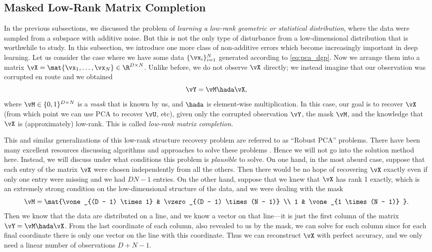 \documentclass[../../book-main.tex]{subfiles}
\begin{document}
\subsection{Masked Low-Rank Matrix Completion}

In the previous subsections, we discussed the problem of
\textit{learning a low-rank geometric or statistical distribution},
where the data were sampled from a subspace with additive noise. But
this is not the only type of disturbance from a low-dimensional
distribution that is worthwhile to study. In this subsection, we
introduce one more class of non-additive errors which become
increasingly important in deep learning. Let us consider the case
where we have some data \(\{\vx_{i}\}_{i = 1}^{N}\) generated
according to \eqref{eq:pca_dgp}. Now we arrange them into a matrix
\(\vX = \mat{\vx_{1}, \dots, \vx_{N}} \in \R^{D \times N}\). Unlike
before, we do not observe \(\vX\) directly; we instead imagine that
our observation was corrupted en route and we obtained
\begin{equation}
    \vY = \vM \hada \vX,
\end{equation}
where \(\vM \in \{0, 1\}^{D \times N}\) is a \textit{mask} that is known by us,
and \(\hada\) is element-wise multiplication. In this case, our goal
is to recover \(\vX\) (from which point we can use PCA to recover
\(\vU\), etc), given only the corrupted observation \(\vY\), the mask
\(\vM\), and the knowledge that \(\vX\) is (approximately) low-rank.
This is called \textit{low-rank matrix completion}.

This and similar generalizations of this low-rank structure recovery
problem are referred to as  ``Robust PCA'' problems. There have been
many excellent resources discussing algorithms and approaches to
solve these problems \cite{Wright-Ma-2022}. Hence we will not go into
the solution method here. Instead, we will discuss under what
conditions this problem is \textit{plausible} to solve. On one hand,
in the most absurd case, suppose that each entry of the matrix
\(\vX\) were chosen independently from all the others. Then there
would be no hope of recovering \(\vX\) exactly even if only one entry
were missing and we had \(DN - 1\) entries. On the other hand,
suppose that we knew that \(\vX\) has rank 1 exactly, which is an
extremely strong condition on the low-dimensional structure of the
data, and we were dealing with the mask
\begin{equation}
    \vM = \mat{\vone_{(D - 1) \times 1} & \vzero_{(D - 1) \times (N -
    1)} \\ 1 & \vone_{1 \times (N - 1)} }.
\end{equation}
Then we know that the data are distributed on a line, and we know a vector on
that line---it is just the first column of the matrix \(\vY = \vM
\hada \vX\). From the last coordinate of each column, also revealed
to us by the mask, we can solve for each column since for each final
coordinate there is only one vector on the line with this coordinate.
Thus we can reconstruct \(\vX\) with perfect accuracy, and we only
need a linear number of observations \(D + N - 1\).
\end{document}
